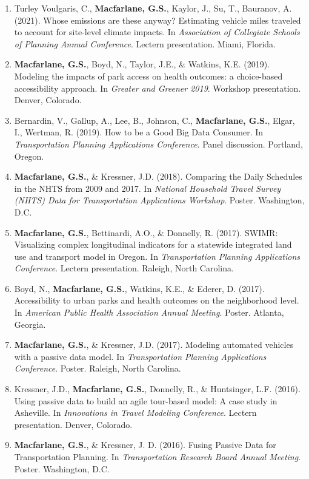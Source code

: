 \documentclass[margin,line]{res}
\newif\ifdetail
\newcounter{enuminitialize}
\newenvironment{myenum}[1][]
{%
 \setcounter{enuminitialize}{#1}
 \addtocounter{enuminitialize}{2}
 \begin{enumerate}[left= 4pt, itemsep=12pt, start=\value{enuminitialize}, label=\arabic*\addtocounter{enumi}{-2}]
}
{%
 \end{enumerate}
}
\begin{document}
\begin{resume}
\begin{myenum}[20]
\item Turley Voulgaris, C., \textbf{Macfarlane, G.S.}, Kaylor, J., Su, T., Bauranov, A. (2021). Whose emissions are these anyway? Estimating vehicle miles traveled to account for site-level climate impacts. In \textit{Association of Collegiate Schools of Planning Annual Conference}. Lectern presentation. Miami, Florida.
\item \textbf{Macfarlane, G.S.}, Boyd, N., Taylor, J.E., \& Watkins, K.E. (2019). Modeling the impacts of park access on health outcomes: a choice-based accessibility approach. In \textit{ Greater and Greener 2019}. Workshop presentation. Denver, Colorado.
\item Bernardin, V., Gallup, A., Lee, B., Johnson, C., \textbf{Macfarlane, G.S.}, Elgar, I., Wertman, R. (2019). How to be a Good Big Data Consumer. In \textit{ Transportation Planning Applications Conference}. Panel discussion. Portland, Oregon.
\item \textbf{Macfarlane, G.S.}, \& Kressner, J.D. (2018). Comparing the Daily Schedules in the NHTS from 2009 and 2017. In \textit{ National Household Travel Survey (NHTS) Data for Transportation Applications Workshop}. Poster. Washington, D.C.
\item \textbf{Macfarlane, G.S.}, Bettinardi, A.O., \& Donnelly, R. (2017). SWIMR: Visualizing complex longitudinal indicators for a statewide integrated land use and transport model in Oregon. In \textit{Transportation Planning Applications Conference}. Lectern presentation. Raleigh, North Carolina.
\item Boyd, N., \textbf{Macfarlane, G.S.}, Watkins, K.E., \& Ederer, D. (2017). Accessibility to urban parks and health outcomes on the neighborhood level. In \textit{ American Public Health Association Annual Meeting}. Poster. Atlanta, Georgia.
\item \textbf{Macfarlane, G.S.}, \& Kressner, J.D. (2017). Modeling automated vehicles with a passive data model. In \textit{ Transportation Planning Applications Conference}. Poster. Raleigh, North Carolina.
\item Kressner, J.D., \textbf{Macfarlane, G.S.}, Donnelly, R., \& Huntsinger, L.F. (2016). Using passive data to build an agile tour-based model: A case study in Asheville. In \textit{ Innovations in Travel Modeling Conference}. Lectern presentation. Denver, Colorado. \ifdetail Citations: 7  \fi
\item \textbf{Macfarlane, G.S.}, \& Kressner, J. D. (2016). Fusing Passive Data for Transportation Planning. In \textit{ Transportation Research Board Annual Meeting}. Poster. Washington, D.C.

\end{myenum}
\end{resume}
\end{document}
